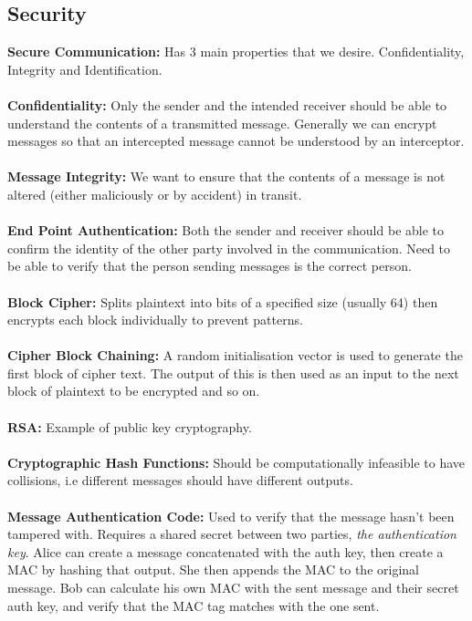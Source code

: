 \documentclass[a4paper,10pt]{article}
\begin{document}
\subsection{Security}
\textcolor{Peach}{\textbf{Secure Communication:}} Has 3 main properties that we desire. Confidentiality, Integrity and Identification. \\\\
\textcolor{Peach}{\textbf{Confidentiality:}} Only the sender and the intended receiver should be able to understand the contents of a transmitted message. Generally we can encrypt messages so that an intercepted message cannot be understood by an interceptor. \\\\
\textcolor{Peach}{\textbf{Message Integrity:}} We want to ensure that the contents of a message is not altered (either maliciously or by accident) in transit. \\\\
\textcolor{Peach}{\textbf{End Point Authentication:}} Both the sender and receiver should be able to confirm the identity of the other party involved in the communication. Need to be able to verify that the person sending messages is the correct person. \\\\
\textcolor{Peach}{\textbf{Block Cipher:}} Splits plaintext into bits of a specified size (usually 64) then encrypts each block individually to prevent patterns. \\\\
\textcolor{Peach}{\textbf{Cipher Block Chaining:}} A random initialisation vector is used to generate the first block of cipher text. The output of this is then used as an input to the next block of plaintext to be encrypted and so on. \\\\
\textcolor{Peach}{\textbf{RSA:}} Example of public key cryptography. \\\\
\textcolor{Peach}{\textbf{Cryptographic Hash Functions:}} Should be computationally infeasible to have collisions, i.e different messages should have different outputs. \\\\
\textcolor{Peach}{\textbf{Message Authentication Code:}} Used to verify that the message hasn't been tampered with. Requires a shared secret between two parties, \emph{the authentication key}. Alice can create a message concatenated with the auth key, then create a MAC by hashing that output. She then appends the MAC to the original message. Bob can calculate his own MAC with the sent message and their secret auth key, and verify that the MAC tag matches with the one sent. \\\\
\end{document}
